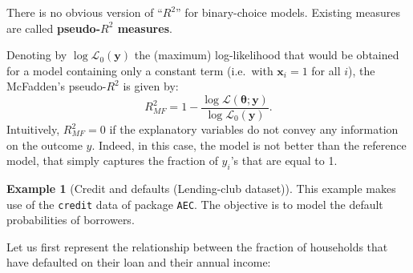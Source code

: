 \documentclass[
  12pt,
]{book}
\newenvironment{Shaded}{\begin{snugshade}}{\end{snugshade}}
\newcommand{\AttributeTok}[1]{\textcolor[rgb]{0.13,0.29,0.53}{#1}}
\newcommand{\DecValTok}[1]{\textcolor[rgb]{0.00,0.00,0.81}{#1}}
\newcommand{\FunctionTok}[1]{\textcolor[rgb]{0.13,0.29,0.53}{\textbf{#1}}}
\newcommand{\NormalTok}[1]{#1}
\newcommand{\OtherTok}[1]{\textcolor[rgb]{0.56,0.35,0.01}{#1}}
\newcommand{\SpecialCharTok}[1]{\textcolor[rgb]{0.81,0.36,0.00}{\textbf{#1}}}
\newcommand{\StringTok}[1]{\textcolor[rgb]{0.31,0.60,0.02}{#1}}
\theoremstyle{definition}
\theoremstyle{definition}
\newtheorem{example}{Example}[chapter]
\theoremstyle{definition}
\theoremstyle{definition}
\theoremstyle{remark}
\begin{document}
There is no obvious version of ``\(R^2\)'' for binary-choice models. Existing measures are called \textbf{pseudo-\(R^2\) measures}.

Denoting by \(\log \mathcal{L}_0(\mathbf{y})\) the (maximum) log-likelihood that would be obtained for a model containing only a constant term (i.e.~with \(\mathbf{x}_i = 1\) for all \(i\)), the McFadden's pseudo-\(R^2\) is given by:
\[
R^2_{MF} = 1 - \frac{\log \mathcal{L}(\boldsymbol\theta;\mathbf{y})}{\log \mathcal{L}_0(\mathbf{y})}.
\]
Intuitively, \(R^2_{MF}=0\) if the explanatory variables do not convey any information on the outcome \(y\). Indeed, in this case, the model is not better than the reference model, that simply captures the fraction of \(y_i\)'s that are equal to 1.

\begin{example}[Credit and defaults (Lending-club dataset)]
\protect\hypertarget{exm:creditProbit}{}\label{exm:creditProbit}This example makes use of the \texttt{credit} data of package \texttt{AEC}. The objective is to model the default probabilities of borrowers.

Let us first represent the relationship between the fraction of households that have defaulted on their loan and their annual income:

\begin{Shaded}
\end{Shaded}


\end{example}
\end{document}
